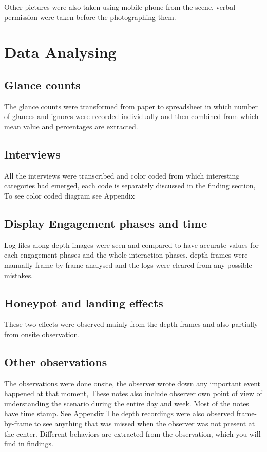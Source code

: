 Other pictures were also taken using mobile phone from the scene, verbal permission were taken before the photographing them.


\section{Data Analysing}

 
\subsection {Glance counts} 
The glance counts were transformed from paper to spreadsheet in which number of glances and ignores were recorded individually and then combined from which mean value and percentages are extracted.

\subsection {Interviews} 
All the interviews were transcribed and color coded from which interesting categories had emerged, each code is separately discussed in the finding section, To see color coded diagram see Appendix



\subsection {Display Engagement phases and time} 
Log files along depth images were seen and compared to have accurate values for each engagement phases and the whole interaction phases. depth frames were manually frame-by-frame analysed and the logs were cleared from any possible mistakes.

\subsection {Honeypot and landing effects}
These two effects were observed mainly from the depth frames and also partially from onsite observation.

\subsection {Other observations}
The observations were done onsite, the observer wrote down any important event happened at that moment, These notes also include observer own point of view of understanding the scenario during the entire day and week. Most of the notes have time stamp. See Appendix
The depth recordings were also observed frame-by-frame to see anything that was missed when the observer was not present at the center. Different behaviors are extracted from the observation, which you will find in findings.



